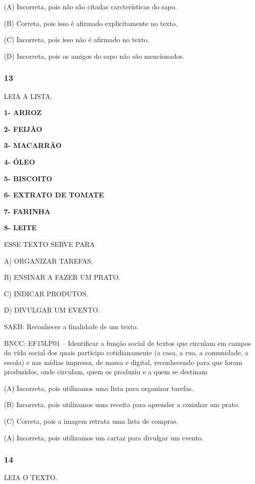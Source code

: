 (A) Incorreta, pois não são citadas carcterísticas do sapo.

(B) Correta, pois isso é afirmado explicitamente no texto.

(C) Incorreta, pois isso não é afirmado no texto.

(D) Incorreta, pois os amigos do sapo não são mencionados.

\subsubsection{13 }\label{section-69}

LEIA A LISTA.

\textbf{1- ARROZ}

\textbf{2- FEIJÃO}

\textbf{3- MACARRÃO}

\textbf{4- ÓLEO}

\textbf{5- BISCOITO}

\textbf{6- EXTRATO DE TOMATE}

\textbf{7- FARINHA}

\textbf{8- LEITE}

ESSE TEXTO SERVE PARA

A) ORGANIZAR TAREFAS.

B) ENSINAR A FAZER UM PRATO.

C) INDICAR PRODUTOS.

D) DIVULGAR UM EVENTO.

SAEB: Reconhecer a finalidade de um texto.

BNCC: EF15LP01 -- Identificar a função social de textos que
circulam em campos da vida social dos quais participa cotidianamente (a
casa, a rua, a comunidade, a escola) e nas mídias impressa, de massa e
digital, reconhecendo para que foram produzidos, onde circulam, quem os
produziu e a quem se destinam

(A) Incorreta, pois utilizamos uma lista para organizar tarefas.

(B) Incorreta, pois utilizamos uma receita para aprender a cozinhar um prato.

(C) Correta, pois a imagem retrata uma lista de compras.

(A) Incorreta, pois utilizamos um cartaz para divulgar um evento.

\subsubsection{14}\label{section-70}

LEIA O TEXTO.

